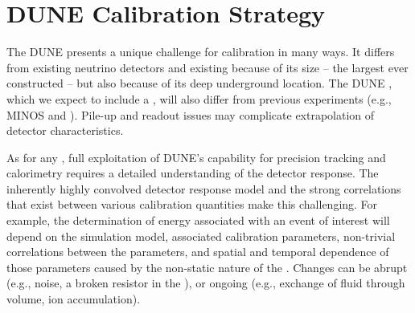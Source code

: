 \section{DUNE Calibration Strategy}
\label{sec:phys-calib-strat}

The DUNE  presents a unique challenge for calibration in many ways. It differs from existing  neutrino detectors and existing  because of its size -- the largest  ever constructed -- but also because of its deep underground location. 
The DUNE , which we expect to include a , will also differ from previous experiments (e.g., MINOS and \nova). Pile-up and readout issues  may complicate extrapolation of detector characteristics.


As for any \lartpc, full exploitation of DUNE's capability for precision tracking and calorimetry requires a detailed understanding of the detector response. The inherently highly convolved detector response model and the strong correlations that exist between various calibration quantities make this challenging. 
For example, the determination of energy associated with an event of interest will depend on the simulation model, associated calibration parameters, non-trivial correlations between the parameters, and spatial and temporal dependence of those parameters caused by the non-static nature of the . 
Changes can be abrupt (e.g., noise, a broken resistor in the ), or ongoing (e.g., exchange of fluid through volume, ion accumulation).

